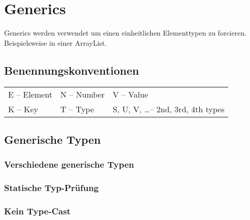 \section{Generics}
Generics werden verwendet um einen einheitlichen Elementtypen zu forcieren. Beispielsweise in einer ArrayList.

\subsection{Benennungskonventionen}
\begin{tabularx}{\columnwidth}{@{}l l l@{}}
    \tabitem{}E -- Element & \tabitem{}N -- Number & \tabitem{}V -- Value\\

    \tabitem{}K -- Key &\tabitem{}T -- Type &\tabitem{}S, U, V, \ldots -- 2nd, 3rd, 4th types
\end{tabularx}

\subsection{Generische Typen}
\vspace{-0.8\abovedisplayskip}
\begin{minipage}[t]{0.6\columnwidth}
    \subsubsection{Verschiedene generische Typen}
    
\end{minipage}\hfill%
\begin{minipage}[t]{0.4\columnwidth}
    \subsubsection{Statische Typ-Prüfung}
    
\end{minipage}

\subsubsection{Kein Type-Cast}



